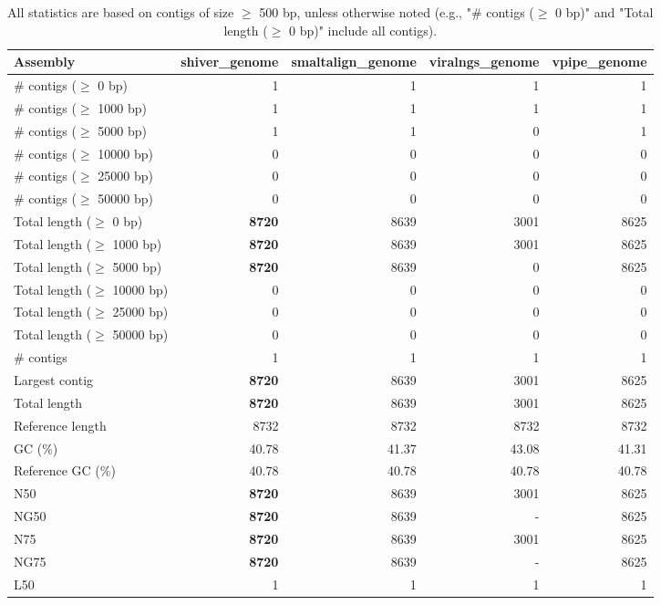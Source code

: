 \documentclass[12pt,a4paper]{article}
\begin{document}
\begin{table}[ht]
\begin{center}
\caption{All statistics are based on contigs of size $\geq$ 500 bp, unless otherwise noted (e.g., "\# contigs ($\geq$ 0 bp)" and "Total length ($\geq$ 0 bp)" include all contigs).}
\begin{tabular}{|l*{4}{|r}|}
\hline
Assembly & shiver\_genome & smaltalign\_genome & viralngs\_genome & vpipe\_genome \\ \hline
\# contigs ($\geq$ 0 bp) & 1 & 1 & 1 & 1 \\ \hline
\# contigs ($\geq$ 1000 bp) & 1 & 1 & 1 & 1 \\ \hline
\# contigs ($\geq$ 5000 bp) & 1 & 1 & 0 & 1 \\ \hline
\# contigs ($\geq$ 10000 bp) & 0 & 0 & 0 & 0 \\ \hline
\# contigs ($\geq$ 25000 bp) & 0 & 0 & 0 & 0 \\ \hline
\# contigs ($\geq$ 50000 bp) & 0 & 0 & 0 & 0 \\ \hline
Total length ($\geq$ 0 bp) & {\bf 8720} & 8639 & 3001 & 8625 \\ \hline
Total length ($\geq$ 1000 bp) & {\bf 8720} & 8639 & 3001 & 8625 \\ \hline
Total length ($\geq$ 5000 bp) & {\bf 8720} & 8639 & 0 & 8625 \\ \hline
Total length ($\geq$ 10000 bp) & 0 & 0 & 0 & 0 \\ \hline
Total length ($\geq$ 25000 bp) & 0 & 0 & 0 & 0 \\ \hline
Total length ($\geq$ 50000 bp) & 0 & 0 & 0 & 0 \\ \hline
\# contigs & 1 & 1 & 1 & 1 \\ \hline
Largest contig & {\bf 8720} & 8639 & 3001 & 8625 \\ \hline
Total length & {\bf 8720} & 8639 & 3001 & 8625 \\ \hline
Reference length & 8732 & 8732 & 8732 & 8732 \\ \hline
GC (\%) & 40.78 & 41.37 & 43.08 & 41.31 \\ \hline
Reference GC (\%) & 40.78 & 40.78 & 40.78 & 40.78 \\ \hline
N50 & {\bf 8720} & 8639 & 3001 & 8625 \\ \hline
NG50 & {\bf 8720} & 8639 & - & 8625 \\ \hline
N75 & {\bf 8720} & 8639 & 3001 & 8625 \\ \hline
NG75 & {\bf 8720} & 8639 & - & 8625 \\ \hline
L50 & 1 & 1 & 1 & 1 \\ \hline

\end{tabular}
\end{center}
\end{table}
\end{document}
